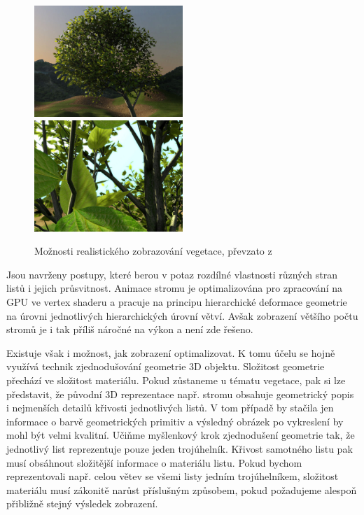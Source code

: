 \begin{figure}[here]
\includegraphics[width=0.5\textwidth]{./figures/HABEL_tree.jpg}
\includegraphics[width=0.5\textwidth]{./figures/HABEL_leaves.jpg}
\caption{Možnosti realistického zobrazování vegetace, převzato z \cite{Habel_2007_RTT} }
\label{fig:HABEL_leaves}
\end{figure}
Jsou navrženy postupy, které berou v potaz rozdílné vlastnosti různých stran listů i jejich průsvitnost. Animace stromu je optimalizována pro zpracování na GPU ve vertex shaderu a pracuje na principu hierarchické deformace geometrie na úrovni jednotlivých hierarchických úrovní větví. Avšak zobrazení většího počtu stromů je i tak příliš náročné na výkon a není zde řešeno.

Existuje však i možnost, jak zobrazení optimalizovat. K tomu účelu se hojně využívá technik zjednodušování geometrie 3D objektu. Složitost geometrie přechází ve složitost materiálu. Pokud zůstaneme u tématu vegetace, pak si lze představit, že původní 3D reprezentace např. stromu obsahuje geometrický popis i nejmenších detailů křivosti jednotlivých listů. V tom případě by stačila jen informace o barvě geometrických primitiv a výsledný obrázek po vykreslení by mohl být velmi kvalitní. Učiňme myšlenkový krok zjednodušení geometrie tak, že jednotlivý list reprezentuje pouze jeden trojúhelník. Křivost samotného listu pak musí obsáhnout složitější informace o materiálu listu. Pokud bychom reprezentovali např. celou větev se všemi listy jedním trojúhelníkem, složitost materiálu musí zákonitě narůst příslušným způsobem, pokud požadujeme alespoň přibližně stejný výsledek zobrazení.
\pagebreak
